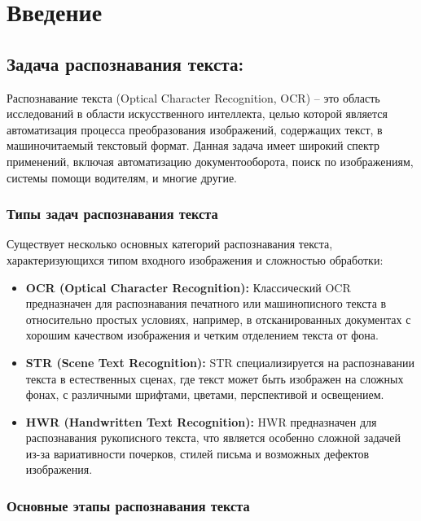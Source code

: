 \section{Введение}
\label{sec:Chapter0} 

\subsection{Задача распознавания текста:}

Распознавание текста (Optical Character Recognition, OCR) -- это область исследований в области искусственного интеллекта, целью которой является автоматизация процесса преобразования изображений, содержащих текст, в машиночитаемый текстовый формат. Данная задача  имеет  широкий  спектр  применений,  включая  автоматизацию  документооборота,  поиск  по  изображениям,  системы  помощи  водителям,  и  многие  другие.

\subsubsection{Типы задач распознавания текста}

Существует несколько основных категорий распознавания текста,  характеризующихся типом  входного  изображения  и  сложностью  обработки:

\begin{itemize}
    \item \textbf{OCR (Optical Character Recognition):}  Классический  OCR  предназначен  для  распознавания  печатного  или  машинописного  текста  в  относительно  простых  условиях,  например,  в  отсканированных  документах  с  хорошим  качеством  изображения  и  четким  отделением  текста  от  фона. 
    \item \textbf{STR (Scene Text Recognition):}  STR  специализируется  на  распознавании  текста  в  естественных  сценах,  где  текст  может  быть  изображен  на  сложных  фонах,  с  различными  шрифтами,  цветами,  перспективой  и  освещением. 
    \item \textbf{HWR (Handwritten Text Recognition):}  HWR  предназначен  для  распознавания  рукописного  текста,  что  является  особенно  сложной  задачей  из-за  вариативности  почерков,  стилей  письма  и  возможных  дефектов  изображения. 
\end{itemize}

\subsubsection{Основные этапы распознавания текста}

